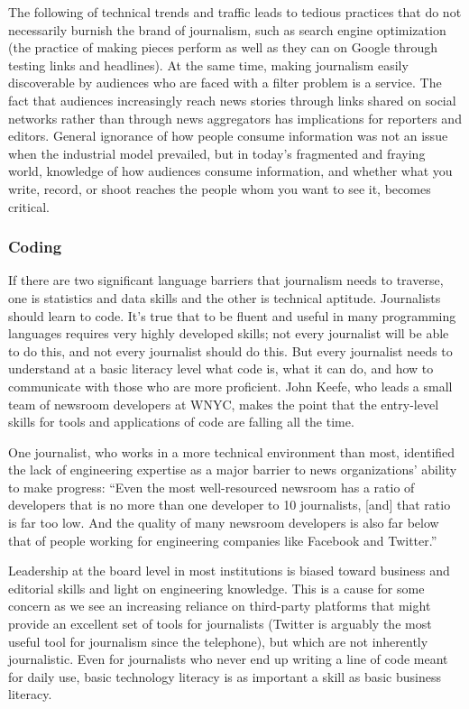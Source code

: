 The following of technical trends and traffic leads to tedious practices that do
not necessarily burnish the brand of journalism, such as search engine optimization
(the practice of making pieces perform as well as they can on Google
through testing links and headlines). At the same time, making journalism easily
discoverable by audiences who are faced with a filter problem is a service. The
fact that audiences increasingly reach news stories through links shared on social
networks rather than through news aggregators has implications for reporters and
editors. General ignorance of how people consume information was not an issue when the industrial model prevailed, but in today’s fragmented and fraying world,
knowledge of how audiences consume information, and whether what you write,
record, or shoot reaches the people whom you want to see it, becomes critical.

\subsubsection{Coding}

If there are two significant language barriers that journalism needs to traverse,
one is statistics and data skills and the other is technical aptitude. Journalists
should learn to code. It’s true that to be fluent and useful in many programming
languages requires very highly developed skills; not every journalist will be able
to do this, and not every journalist should do this. But every journalist needs
to understand at a basic literacy level what code is, what it can do, and how to
communicate with those who are more proficient. John Keefe, who leads a small
team of newsroom developers at WNYC, makes the point that the entry-level
skills for tools and applications of code are falling all the time.

One journalist, who works in a more technical environment than most, identified
the lack of engineering expertise as a major barrier to news organizations’
ability to make progress: ``Even the most well-resourced newsroom has a ratio of
developers that is no more than one developer to 10 journalists, [and] that ratio
is far too low. And the quality of many newsroom developers is also far below
that of people working for engineering companies like Facebook and Twitter.''

Leadership at the board level in most institutions is biased toward business and
editorial skills and light on engineering knowledge. This is a cause for some concern
as we see an increasing reliance on third-party platforms that might provide
an excellent set of tools for journalists (Twitter is arguably the most useful tool
for journalism since the telephone), but which are not inherently journalistic.
Even for journalists who never end up writing a line of code meant for daily use,
basic technology literacy is as important a skill as basic business literacy.

